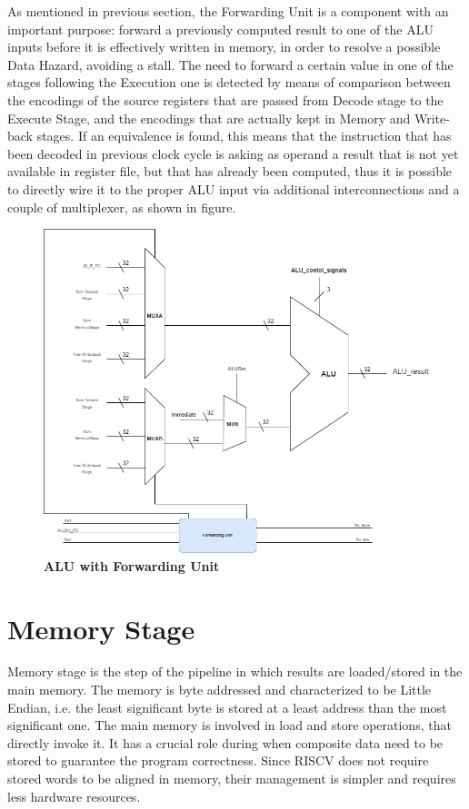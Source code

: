 As mentioned in previous section, the Forwarding Unit is a component with an important purpose: forward a previously computed result to one of the ALU inputs
before it is effectively written in memory, in order to resolve a possible Data Hazard, avoiding a stall.
The need to forward a certain value in one of the stages following the Execution one is detected by means of comparison between the encodings of the source registers 
that are passed from Decode stage to the Execute Stage, and the encodings that are actually kept in Memory and Write-back stages.
If an equivalence is found, this means that the instruction that has been decoded in previous clock cycle is asking as operand a result that is not yet available 
in register file, but that has already been computed, thus it is possible to directly wire it to the proper ALU input via additional interconnections
and a couple of multiplexer, as shown in figure.  

\clearpage

\begin{figure}[!h]
    \centering
        \includegraphics[width=\linewidth]{schematic/ALUwithForwardingUnit.jpg}
        \caption{\textbf{ALU with Forwarding Unit}}
\end{figure}
    

\section{Memory Stage}

Memory stage is the step of the pipeline in which results are loaded/stored in the main memory.
The memory is byte addressed and characterized to be Little Endian, i.e. the least significant byte is stored at a least address than the most significant one.
The main memory is involved in load and store operations, that directly invoke it. It has a crucial role during when composite data need to be stored to guarantee 
the program correctness.
Since RISCV does not require stored words to be aligned in memory, their management is simpler and requires less hardware resources.

